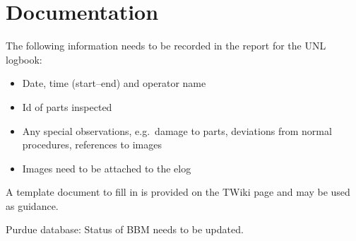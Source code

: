 \documentclass[12pt]{unlsilabsop}
\begin{document}
\section{Documentation}
The following information needs to be recorded in the report for the UNL logbook:
\begin{itemize}
    \item Date, time (start--end) and operator name
    \item Id of parts inspected
    \item Any special observations, e.g.~damage to parts, deviations from normal procedures, references to images
    \item Images need to be attached to the elog
\end{itemize}
A template document to fill in is provided on the TWiki page and may be used as guidance.

Purdue database: Status of BBM needs to be updated.
\end{document}
